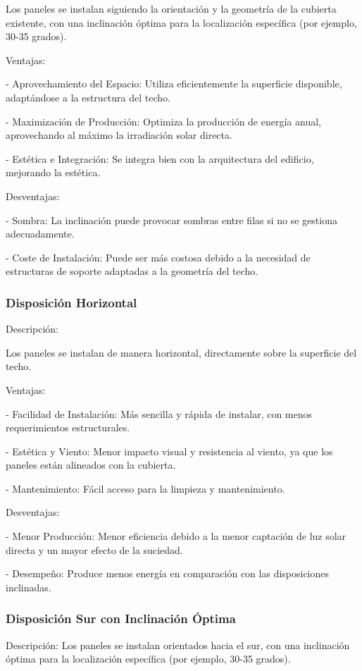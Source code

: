 \documentclass{article}
\begin{document}
Los paneles se instalan siguiendo la orientación y la geometría de la cubierta existente, con una inclinación óptima para la localización específica (por ejemplo, 30-35 grados).

Ventajas:

- Aprovechamiento del Espacio: Utiliza eficientemente la superficie disponible, adaptándose a la estructura del techo.

- Maximización de Producción: Optimiza la producción de energía anual, aprovechando al máximo la irradiación solar directa.

- Estética e Integración: Se integra bien con la arquitectura del edificio, mejorando la estética.

Desventajas:

- Sombra: La inclinación puede provocar sombras entre filas si no se gestiona adecuadamente.

- Coste de Instalación: Puede ser más costosa debido a la necesidad de estructuras de soporte adaptadas a la geometría del techo.


\subsubsection*{Disposición Horizontal}
Descripción:

Los paneles se instalan de manera horizontal, directamente sobre la superficie del techo.


Ventajas:

- Facilidad de Instalación: Más sencilla y rápida de instalar, con menos requerimientos estructurales.

- Estética y Viento: Menor impacto visual y resistencia al viento, ya que los paneles están alineados con la cubierta.

- Mantenimiento: Fácil acceso para la limpieza y mantenimiento.

Desventajas:

- Menor Producción: Menor eficiencia debido a la menor captación de luz solar directa y un mayor efecto de la suciedad.

- Desempeño: Produce menos energía en comparación con las disposiciones inclinadas.

\subsubsection*{Disposición Sur con Inclinación Óptima}
Descripción:
Los paneles se instalan orientados hacia el sur, con una inclinación óptima para la localización específica (por ejemplo, 30-35 grados).
\end{document}
